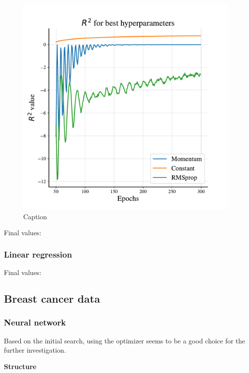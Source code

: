 \begin{figure}
    \centering
    \includegraphics[width=1.0\linewidth]{project_2/figures/best_continuous.pdf}
    \caption{Caption}
    \label{fig:best_franke}
\end{figure}

Final values: 



\subsubsection{Linear regression}

Final values: 

\subsection{Breast cancer data}

\subsubsection{Neural network}


Based on the initial search, using the  optimizer seems to be a good choice for the further investigation.

\textbf{Structure}

